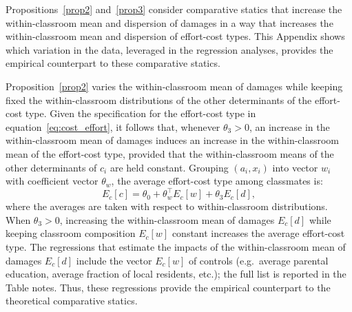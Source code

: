 Propositions~\ref{prop2} and~\ref{prop3} consider comparative statics that increase the within-classroom mean and dispersion of damages in a way that increases the within-classroom mean and dispersion of effort-cost types. This Appendix shows which variation in the data, leveraged in the regression analyses, provides the empirical counterpart to these comparative statics.\par %

Proposition~\ref{prop2} varies the within-classroom mean of damages while keeping fixed the within-classroom distributions of the other determinants of the effort-cost type. Given the specification for the effort-cost type in equation~\eqref{eq:cost_effort}, it follows that, whenever $\theta_3>0$, an increase in the within-classroom mean of damages induces an increase in the within-classroom mean of the effort-cost type, provided that the within-classroom means of the other determinants of $c_i$ are held constant. Grouping $(a_i,x_i)$ into vector $w_i$ with coefficient vector $\theta_w$, the average effort-cost type among classmates is:
\begin{equation}
E_c[c] = \theta_0 + \theta_w^\top E_c[w] + \theta_3 E_c[d],
\end{equation}
\noindent where the averages are taken with respect to within-classroom distributions. When $\theta_3>0$, increasing the within-classroom mean of damages $E_c[d]$ while keeping classroom composition $E_c[w]$ constant increases the average effort-cost type. The regressions that estimate the impacts of the within-classroom mean of damages $E_c[d]$ include the vector $E_c[w]$ of controls (e.g.\ average parental education, average fraction of local residents, etc.); the full list is reported in the Table notes. Thus, these regressions provide the empirical counterpart to the theoretical comparative statics.\par 


